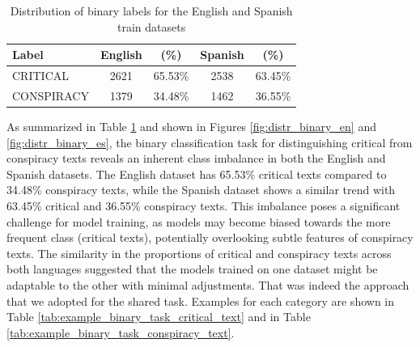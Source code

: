 \documentclass{Configuration_Files/PoliMi3i_thesis}
\begin{document}
\begin{table}[H]
    \centering
    \begin{tabular}{lcccc}
        \hline
        \textbf{Label} & \textbf{English} & \textbf{(\%)} & \textbf{Spanish} & \textbf{(\%)} \\
        \hline
        CRITICAL     & 2621 & 65.53\% & 2538 & 63.45\% \\
        CONSPIRACY   & 1379 & 34.48\% & 1462 & 36.55\% \\
        \hline
    \end{tabular}
    \caption{\small Distribution of binary labels for the English and Spanish train datasets}
    \label{tab:label_distribution_1}
\end{table}



\noindent As summarized in Table \ref{tab:label_distribution_1} and shown in Figures \ref{fig:distr_binary_en} and \ref{fig:distr_binary_es}, the binary classification task for distinguishing critical from conspiracy texts reveals an inherent class imbalance in both the English and Spanish datasets. The English dataset has 65.53\% critical texts compared to 34.48\% conspiracy texts, while the Spanish dataset shows a similar trend with 63.45\% critical and 36.55\% conspiracy texts. This imbalance poses a significant challenge for model training, as models may become biased towards the more frequent class (critical texts), potentially overlooking subtle features of conspiracy texts.
The similarity in the proportions of critical and conspiracy texts across both languages suggested that the models trained on one dataset might be adaptable to the other with minimal adjustments. That was indeed the approach that we adopted for the shared task. Examples for each category are shown in Table \ref{tab:example_binary_task_critical_text} and in Table \ref{tab:example_binary_task_conspiracy_text}.
\end{document}
